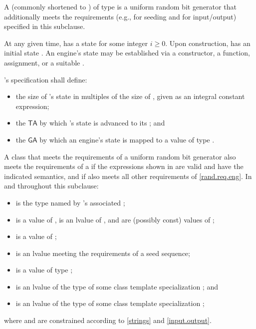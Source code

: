 \pnum
A 
(commonly shortened to )
 of type 
is a uniform random bit generator
that additionally meets the requirements
(e.g., for seeding and for input/output)
specified in this subclause.

\pnum
At any given time,
 has a state 
for some integer $i \geq 0$.
Upon construction,
has an initial state .
An engine's state may be established via
 a constructor,
 a  function,
 assignment,
 or a suitable .

\pnum
{}'s specification shall define:
\begin{itemize}
 \item
   the size of 's state
   in multiples of the size of ,
   given as an integral constant expression;
 \item
   the 
   $\mathsf{TA}$
   by which 's state 
   is advanced to its 
   ;
 and
 \item
   the 
   $\mathsf{GA}$
   by which an engine's state is mapped
   to a value of type .
\end{itemize}

\pnum
A class 
that meets the requirements
of a uniform random bit generator
also meets the requirements
of a 
if the expressions shown
in 
are valid and have the indicated semantics,
and if  also meets all other requirements
of \ref{rand.req.eng}.
In  and throughout this subclause:
\begin{itemize}
  \item
     is the type named by
    's associated ;
  \item
     is a value of ,
     is an lvalue of ,
     and  are (possibly const) values of ;
  \item
     is a value of ;
  \item
     is an lvalue
    meeting the requirements of a seed sequence;
  \item
     is a value
    of type ;
  \item
     is an lvalue of the type of some class template specialization
     ;
  and
  \item
     is an lvalue of the type of some class template specialization
     ;
\end{itemize}
where  and  are constrained
according to \ref{strings} and \ref{input.output}.

